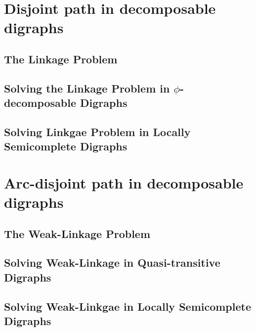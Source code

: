 \chapter{Disjoint path in decomposable digraphs}
\label{chap:linkage}

\section{The Linkage Problem}
\label{sec:lNP}


\section{Solving the Linkage Problem in $\phi$-decomposable Digraphs}
\label{sec:lQuasi}


\section{Solving Linkgae Problem in Locally Semicomplete Digraphs}
\label{sec:lLocally}

\chapter{Arc-disjoint path in decomposable digraphs}
\label{chap:weak}

\section{The Weak-Linkage Problem}
\label{sec:wNP}

\section{Solving Weak-Linkage in Quasi-transitive Digraphs}
\label{sec:wQuasi}

\section{Solving Weak-Linkgae in Locally Semicomplete Digraphs}
\label{sec:wLocally}


